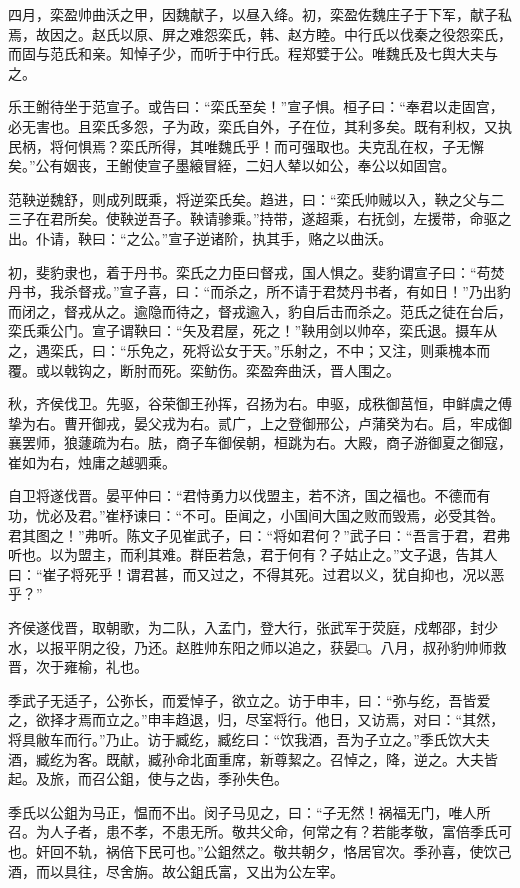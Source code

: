 \documentclass[]{article}
\begin{document}
四月，栾盈帅曲沃之甲，因魏献子，以昼入绛。初，栾盈佐魏庄子于下军，献子私焉，故因之。赵氏以原、屏之难怨栾氏，韩、赵方睦。中行氏以伐秦之役怨栾氏，而固与范氏和亲。知悼子少，而听于中行氏。程郑嬖于公。唯魏氏及七舆大夫与之。

乐王鲋待坐于范宣子。或告曰：``栾氏至矣！''宣子惧。桓子曰：``奉君以走固宫，必无害也。且栾氏多怨，子为政，栾氏自外，子在位，其利多矣。既有利权，又执民柄，将何惧焉？栾氏所得，其唯魏氏乎！而可强取也。夫克乱在权，子无懈矣。''公有姻丧，王鲋使宣子墨縗冒絰，二妇人辇以如公，奉公以如固宫。

范鞅逆魏舒，则成列既乘，将逆栾氏矣。趋进，曰：``栾氏帅贼以入，鞅之父与二三子在君所矣。使鞅逆吾子。鞅请骖乘。''持带，遂超乘，右抚剑，左援带，命驱之出。仆请，鞅曰：``之公。''宣子逆诸阶，执其手，赂之以曲沃。

初，斐豹隶也，着于丹书。栾氏之力臣曰督戎，国人惧之。斐豹谓宣子曰：``苟焚丹书，我杀督戎。''宣子喜，曰：``而杀之，所不请于君焚丹书者，有如日！''乃出豹而闭之，督戎从之。逾隐而待之，督戎逾入，豹自后击而杀之。范氏之徒在台后，栾氏乘公门。宣子谓鞅曰：``矢及君屋，死之！''鞅用剑以帅卒，栾氏退。摄车从之，遇栾氏，曰：``乐免之，死将讼女于天。''乐射之，不中；又注，则乘槐本而覆。或以戟钩之，断肘而死。栾鲂伤。栾盈奔曲沃，晋人围之。

秋，齐侯伐卫。先驱，谷荣御王孙挥，召扬为右。申驱，成秩御莒恒，申鲜虞之傅挚为右。曹开御戎，晏父戎为右。贰广，上之登御邢公，卢蒲癸为右。启，牢成御襄罢师，狼蘧疏为右。胠，商子车御侯朝，桓跳为右。大殿，商子游御夏之御寇，崔如为右，烛庸之越驷乘。

自卫将遂伐晋。晏平仲曰：``君恃勇力以伐盟主，若不济，国之福也。不德而有功，忧必及君。''崔杼谏曰：``不可。臣闻之，小国间大国之败而毁焉，必受其咎。君其图之！''弗听。陈文子见崔武子，曰：``将如君何？''武子曰：``吾言于君，君弗听也。以为盟主，而利其难。群臣若急，君于何有？子姑止之。''文子退，告其人曰：``崔子将死乎！谓君甚，而又过之，不得其死。过君以义，犹自抑也，况以恶乎？''

齐侯遂伐晋，取朝歌，为二队，入孟门，登大行，张武军于荧庭，戍郫邵，封少水，以报平阴之役，乃还。赵胜帅东阳之师以追之，获晏□。八月，叔孙豹帅师救晋，次于雍榆，礼也。

季武子无适子，公弥长，而爱悼子，欲立之。访于申丰，曰：``弥与纥，吾皆爱之，欲择才焉而立之。''申丰趋退，归，尽室将行。他日，又访焉，对曰：``其然，将具敝车而行。''乃止。访于臧纥，臧纥曰：``饮我酒，吾为子立之。''季氏饮大夫酒，臧纥为客。既献，臧孙命北面重席，新尊絜之。召悼之，降，逆之。大夫皆起。及旅，而召公鉏，使与之齿，季孙失色。

季氏以公鉏为马正，愠而不出。闵子马见之，曰：``子无然！祸福无门，唯人所召。为人子者，患不孝，不患无所。敬共父命，何常之有？若能孝敬，富倍季氏可也。奸回不轨，祸倍下民可也。''公鉏然之。敬共朝夕，恪居官次。季孙喜，使饮己酒，而以具往，尽舍旃。故公鉏氏富，又出为公左宰。
\end{document}
